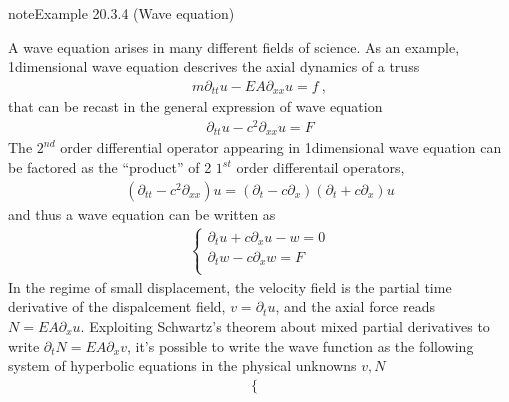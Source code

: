 \documentclass[letterpaper,10pt,english]{jupyterBook}
\begin{document}
\begin{sphinxadmonition}{note}{Example 20.3.4 (Wave equation)}



\sphinxAtStartPar
A wave equation arises in many different fields of science. As an example, 1\sphinxhyphen{}dimensional wave equation descrives the axial dynamics of a truss
\begin{equation*}
\begin{split}m \partial_{tt} u - EA \partial_{xx} u = f \ ,\end{split}
\end{equation*}
\sphinxAtStartPar
that can be recast in the general expression of wave equation
\begin{equation*}
\begin{split}\partial_{tt} u - c^2 \partial_{xx} u = F\end{split}
\end{equation*}
\sphinxAtStartPar
The \(2^{nd}\) order differential operator appearing in 1\sphinxhyphen{}dimensional wave equation can be factored as the “product” of 2 \(1^{st}\) order differentail operators,
\begin{equation*}
\begin{split}\left( \partial_{tt} - c^2 \partial_{xx} \right) u = \left( \partial_t - c \partial_x \right) \left( \partial_t + c \partial_x \right) u\end{split}
\end{equation*}
\sphinxAtStartPar
and thus a wave equation can be written as
\begin{equation*}
\begin{split}\begin{cases}
  \partial_t u + c \partial_x u - w = 0 \\
  \partial_t w - c \partial_x w     = F \\
\end{cases}\end{split}
\end{equation*}
\sphinxAtStartPar
In the regime of small displacement, the velocity field is the partial time derivative of the dispalcement field, \(v = \partial_t u\), and the axial force reads \(N = EA \partial_x u\). Exploiting Schwartz’s theorem about mixed partial derivatives to write \(\partial_t N = EA \partial_x v\), it’s possible to write the wave function as the following system of hyperbolic equations in the physical unknowns \(v, N\)
\begin{equation*}
\begin{split}\begin{cases}

\end{cases}
\end{split}
\end{equation*}
\end{sphinxadmonition}
\end{document}
